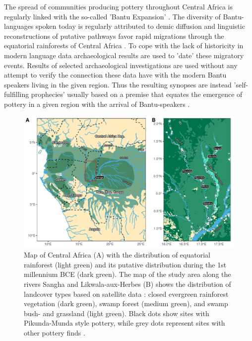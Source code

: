 \documentclass[smallextended,natbib]{svjour3}       %
\begin{document}
The spread of communities producing pottery throughout Central Africa is regularly linked with the so-called 'Bantu Expansion' \citep{Bostoen.2018,Bostoen.2020}. The diversity of Bantu-languages spoken today is regularly attributed to demic diffusion \citep{Pakendorf.2011,Bostoen.2022} and linguistic reconstructions of putative pathways favor rapid migrations through the equatorial rainforests of Central Africa \citep{Grollemund.2015,Bostoen.2015,Koile.2022}. To cope with the lack of historicity in modern language data archaeological results are used to 'date' these migratory events. Results of selected archaeological investigations are used without any attempt to verify the connection these data have with the modern Bantu speakers living in the given region. Thus the resulting synopses are instead 'self-fulfilling prophecies' usually based on a premise that equates the emergence of pottery in a given region with the arrival of Bantu-speakers \citep[355,362,364]{Bostoen.2015}.

\begin{figure}[!tb]
	\includegraphics[width=\textwidth]{Fig_Map.pdf}
	\caption{Map of Central Africa (A) with the distribution of equatorial rainforest \citep{White.1983} (light green) and its putative distribution during the 1st millennium BCE \citep{Bremond.2017,Maley.2017} (dark green). The map of the study area along the rivers Sangha and Likwala-aux-Herbes (B) shows the distribution of landcover types based on satellite data \citep{Mayaux.2003}: closed evergreen rainforest vegetation (dark green), swamp forest (medium green), and swamp bush- and grassland (light green). Black dots show sites with Pikunda-Munda style pottery, while grey dots represent sites with other pottery finds \citep[11 Fig.~1, 119 Fig.~49]{Seidensticker.2021e}.}
	\label{fig:map}
\end{figure}
\end{document}
